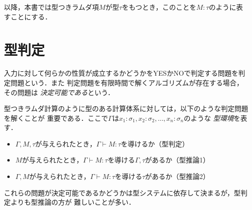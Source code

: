 \documentclass[uplatex,dvipdfmx,report,fleqn]{jsbook}
\begin{document}
以降，本書では型つきラムダ項$M$が型$\tau$をもつとき，このことを$M:\tau$のように表すことにする．

\section{型判定}

入力に対して何らかの性質が成立するかどうかをYESかNOで判定する問題を判定問題という．また
判定問題を有限時間で解くアルゴリズムが存在する場合，その問題は
\emph{決定可能である}という．

型つきラムダ計算のように型のある計算体系に対しては，以下のような判定問題を解くことが
重要である．ここで$\Gamma$は$x_1:\sigma_1, x_2:\sigma_2, \dots, x_n:\sigma_n$のような
\emph{型環境}を表す．
%
\begin{itemize}
\item $\Gamma, M, \tau$が与えられたとき，$\Gamma\vdash M:\tau$を導けるか（型判定）
\item $M$が与えられたとき，$\Gamma\vdash M:\tau$を導ける$\Gamma, \tau$があるか（型推論1）
\item $\Gamma, M$が与えられたとき，$\Gamma\vdash M:\tau$を導ける$\tau$があるか（型推論2）
\end{itemize}
%
これらの問題が決定可能であるかどうかは型システムに依存して決まるが，型判定よりも型推論の方が
難しいことが多い．
\end{document}
